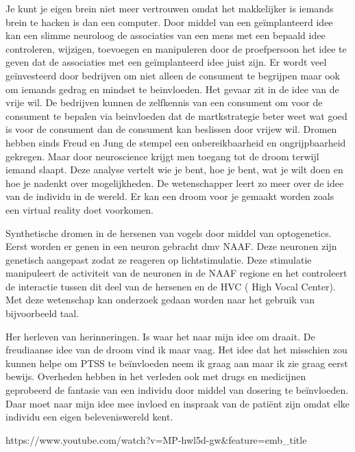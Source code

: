 \documentclass[11pt]{report}
\begin{document}
Je kunt je eigen brein niet meer vertrouwen omdat het makkelijker is iemands brein te hacken is dan een computer. Door middel van een geïmplanteerd idee kan een slimme neuroloog de associaties van een mens met een bepaald idee controleren,  wijzigen, toevoegen en manipuleren door de proefpersoon het idee te geven dat de associaties met een geïmplanteerd idee juist zijn.
Er wordt veel geïnvesteerd door bedrijven om niet alleen de consument te begrijpen maar ook om iemands gedrag en mindset te beinvloeden. Het gevaar zit in de idee van de vrije wil. De bedrijven kunnen de zelfkennis van een consument om voor de consument te bepalen via beinvloeden dat de martkstrategie beter weet wat goed is voor de consument dan de consument kan beslissen door vrijew wil.
Dromen hebben sinds Freud en Jung de stempel een onbereikbaarheid en ongrijpbaarheid gekregen. Maar door neuroscience krijgt men toegang tot de droom terwijl iemand slaapt.  Deze analyse vertelt wie je bent, hoe je bent, wat je wilt doen en hoe je nadenkt over mogelijkheden. De wetenschapper leert zo meer over de idee van de individu in de wereld. Er kan een droom voor je gemaakt worden zoals een virtual reality doet voorkomen.

Synthetische dromen in de hersenen van vogels door middel van optogenetics. Eerst worden er genen in een neuron gebracht dmv NAAF. Deze neuronen zijn genetisch aangepast zodat ze reageren op lichtstimulatie. Deze stimulatie manipuleert de activiteit van de neuronen in de NAAF regione en het controleert  de interactie tussen dit deel van de hersenen en de HVC ( High Vocal Center). Met deze wetenschap kan onderzoek gedaan worden naar het gebruik van bijvoorbeeld taal.

Her herleven van herinneringen. Is waar het naar mijn idee om draait. De freudiaanse idee van de droom vind ik maar vaag. Het idee dat het misschien zou kunnen helpe om PTSS te beïnvloeden neem ik graag aan maar ik zie graag eerst bewijs.
Overheden hebben in het verleden ook met drugs en medicijnen geprobeerd de fantasie van een individu door middel van dosering te beïnvloeden. Daar moet naar mijn idee mee invloed en inspraak van de patiënt zijn omdat elke individu een eigen beleveniswereld kent.

https://www.youtube.com/watch?v=MP-hwl5d-gw&feature=emb_title
\end{document}
